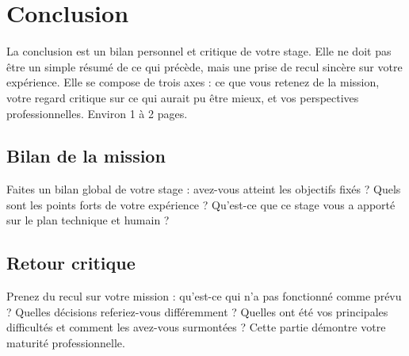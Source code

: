 \section{Conclusion}

\begin{guideline}
La conclusion est un bilan personnel et critique de votre stage. Elle
ne doit pas être un simple résumé de ce qui précède, mais une prise de
recul sincère sur votre expérience. Elle se compose de trois axes :
ce que vous retenez de la mission, votre regard critique sur ce qui
aurait pu être mieux, et vos perspectives professionnelles. Environ
1 à 2 pages.
\end{guideline}


\subsection{Bilan de la mission}

\begin{guideline}
Faites un bilan global de votre stage : avez-vous atteint les objectifs
fixés ? Quels sont les points forts de votre expérience ? Qu'est-ce que
ce stage vous a apporté sur le plan technique et humain ?
\end{guideline}



\subsection{Retour critique}

\begin{guideline}
Prenez du recul sur votre mission : qu'est-ce qui n'a pas fonctionné
comme prévu ? Quelles décisions referiez-vous différemment ? Quelles
ont été vos principales difficultés et comment les avez-vous surmontées ?
Cette partie démontre votre maturité professionnelle.
\end{guideline}



